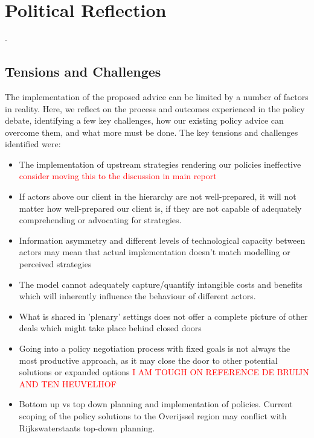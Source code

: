 \section{Political Reflection}
\label{s:poli_reflect}

- 

\subsection{Tensions and Challenges}


The implementation of the proposed advice can be limited by a number of factors in reality. Here, we reflect on the process and outcomes experienced in the policy debate, identifying a few key challenges, how our existing policy advice can overcome them, and what more must be done. The key tensions and challenges identified were:
\begin{itemize}
    \item The implementation of upstream strategies rendering our policies ineffective \textcolor{red}{consider moving this to the discussion in main report}
    \item If actors above our client in the hierarchy are not well-prepared, it will not matter how well-prepared our client is, if they are not capable of adequately comprehending or advocating for strategies.
    \item Information asymmetry and different levels of technological capacity between actors may mean that actual implementation doesn't match modelling or perceived strategies
    \item The model cannot adequately capture/quantify intangible costs and benefits which will inherently influence the behaviour of different actors.
    \item What is shared in 'plenary' settings does not offer a complete picture of other deals which might take place behind closed doors
    \item Going into a policy negotiation process with fixed goals is not always the most productive approach, as it may close the door to other potential solutions or expanded options \textcolor{red}{I AM TOUGH ON REFERENCE DE BRUIJN AND TEN HEUVELHOF}
    \item Bottom up vs top down planning and implementation of policies. Current scoping of the policy solutions to the Overijssel region may conflict with Rijkswaterstaats top-down planning. 
\end{itemize}

